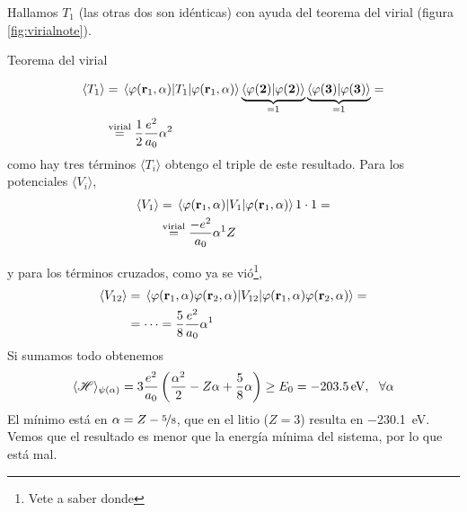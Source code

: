 Hallamos $T_1$ (las otras dos son idénticas) con ayuda del teorema del
virial (figura \ref{fig:virialnote}).

\begin{marginfigure}
  \caption{Teorema del virial}
  \label{fig:virialnote}
\end{marginfigure}
\begin{equation}
  \begin{split}
    \langle T_1 \rangle &= \ev{T_1}{\varphi(\boldrm{r}_1,\alpha)}
    \underbrace{\ip{\varphi(\boldrm{2})}}_{=1} \underbrace{\ip{\varphi(\boldrm{3})}}_{=1} = \\
    & \stackrel{\text{virial}}= \frac{1}{2} \frac{e^2}{a_0}\alpha^2
  \end{split}
\end{equation}
como hay tres términos $\langle T_i\rangle$ obtengo el triple de este
resultado. Para los potenciales $\langle V_i \rangle$,
\begin{equation}
  \begin{split}
    \langle V_1 \rangle  &= \ev{V_1}{\varphi(\boldrm{r}_1,\alpha)}
    1\cdot 1  = \\
    & \stackrel{\text{virial}}=  \frac{-e^2}{a_0}\alpha^1 Z
  \end{split}
\end{equation}

y para los términos cruzados, como ya se vió\footnote{Vete a saber donde},
\begin{equation}
  \begin{split}
    \langle V_{12} \rangle  &= \ev{V_{12}}{\varphi(\boldrm{r}_1,\alpha)\varphi(\boldrm{r}_2,\alpha)}
     = \\
    &= \cdots = \frac{5}{8} \frac{e^2}{a_0}\alpha^1 
  \end{split}
\end{equation}
Si sumamos todo obtenemos
\begin{equation}
  \langle \Ham \rangle_{\psi(\alpha)} = 3 \frac{e^2}{a_0} \left(
    \frac{\alpha^2}{2}-Z\alpha+ \frac{5}{8}\alpha \right) \geq E_0 =
  \SI{-203.5}{\eV},\ \ \forall \alpha
\end{equation}
El mínimo está en $\alpha = Z- \nicefrac{5}{8}$, que en el litio
($Z=3$) resulta en \SI{-230.1}{\eV}. Vemos que el resultado es menor
que la energía mínima del sistema, por lo que está mal.

